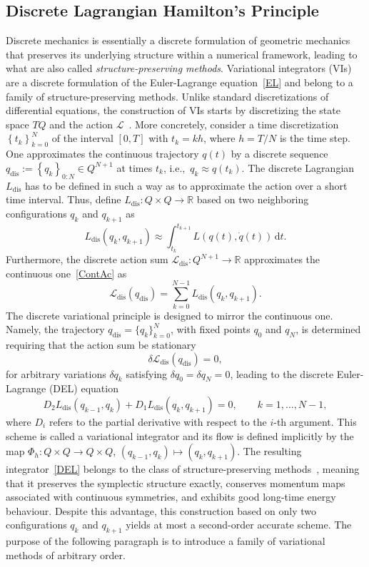 \documentclass[a4paper,10pt,reqno]{amsart}
\theoremstyle{definition}
\newcommand{\R}{\mathbb{R}}      %
\newcommand{\Flder}{\rightarrow}
\newcommand{\dd}{\mathrm{d}}
\newcommand{\dis}{\text{dis}}
\begin{document}
\subsection{Discrete Lagrangian Hamilton's Principle}\label{Disc}
Discrete mechanics is essentially a discrete formulation of geometric mechanics that preserves its underlying structure within a numerical framework, leading to what are also called \textit{structure-preserving methods}.  Variational integrators (VIs) are a discrete formulation of the Euler-Lagrange equation~\eqref{EL} and belong to a family of structure-preserving methods. Unlike standard discretizations of differential equations,  the construction of VIs starts by discretizing  the state space $TQ$ and the action $\mathcal{L}$~\cite{MaWe}. More concretely, consider a time discretization $\left\{t_k\right\}_{k=0}^N$ of the interval $[0,T]$ with $t_k=kh$, where $h=T/N$ is the time step. One approximates the continuous trajectory $q(t)$ by a discrete sequence $q_\dis^{}:=\left\{ q_k\right\}_{0:N}\in Q^{N+1}$ at times $t_k$, i.e.,~$q_k\approx q(t_k)$. The discrete Lagrangian $L_\dis $ has to be defined in such a way as to approximate the action over a short time interval.  Thus, define $L_\dis:Q\times Q\Flder\R$ based on two neighboring configurations $q_k$ and $q_{k+1}$ as
\begin{equation}\label{TwoPointsApprox}
L_\dis (q_k,q_{k+1})\approx \int_{t_k}^{t_{k+1}}L(q(t),\dot q(t))\,\dd t.
\end{equation}
Furthermore, the discrete action sum $\mathcal{L}_\dis :Q^{N+1}\Flder\R$ approximates the continuous one~\eqref{ContAc} as
\[
\mathcal{L}_\dis (q_\dis^{})=\sum_{k=0}^{N-1}L_\dis (q_k,q_{k+1}).
\]
The discrete variational principle is designed to mirror the continuous one. Namely, the trajectory $q_\dis =\{q_k\}_{k=0}^N$, with fixed points $q_0$ and $q_N$, is determined requiring that the action sum be stationary
\[
\delta \mathcal{L}_\dis (q_\dis )=0,
\]
for arbitrary variations $\delta q_k$ satisfying $\delta q_0 = \delta q_N =
   0$, leading to the discrete Euler-Lagrange (DEL) equation 
\begin{equation}\label{DEL}
D_2L_\dis (q_{k-1},q_{k})+D_1L_\dis (q_k,q_{k+1})=0,\qquad k=1,\ldots, N-1,
\end{equation}
where $D_i$ refers to the partial derivative with respect to the $i$-th argument. This scheme is called a variational integrator and its flow is defined implicitly by the map  $\Phi_h:Q\times Q\Flder Q\times Q$, $(q_{k-1},q_k)\mapsto (q_k,q_{k+1})$. 
The resulting integrator~\eqref{DEL} belongs to the class of structure-preserving methods~\cite{LuGeWa,Raff2023,SerFer2016}, meaning that it preserves the symplectic structure exactly, conserves momentum maps 
  associated with continuous symmetries, and exhibits good long-time energy    behaviour. Despite this advantage, this construction based on only two configurations $q_k$ and $q_{k+1}$ yields at most a second-order accurate scheme. The purpose of the following paragraph is to introduce a family of variational methods of arbitrary order. 
\end{document}
